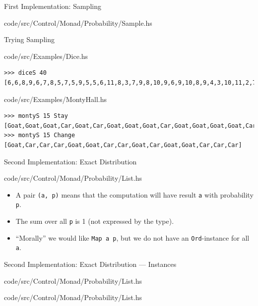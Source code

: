 ﻿\documentclass[aspectratio=169]{beamer}
\begin{document}
\begin{frame}{First Implementation: Sampling}
    
        {code/src/Control/Monad/Probability/Sample.hs}
\end{frame}

\begin{frame}[fragile]{Trying Sampling}
    
        {code/src/Examples/Dice.hs}
    \begin{lstlisting}[backgroundcolor=\color{lightgray}]
>>> diceS 40
[6,6,8,9,6,7,8,5,7,5,9,5,5,6,11,8,3,7,9,8,10,9,6,9,10,8,9,4,3,10,11,2,7,11,6,6,4,6,7,7]
    \end{lstlisting}
\pause
    
        {code/src/Examples/MontyHall.hs}
    \begin{lstlisting}[backgroundcolor=\color{lightgray}]
>>> montyS 15 Stay
[Goat,Goat,Goat,Car,Goat,Car,Goat,Goat,Goat,Car,Goat,Goat,Goat,Goat,Car]
>>> montyS 15 Change
[Goat,Car,Car,Car,Goat,Goat,Car,Car,Goat,Car,Goat,Goat,Car,Car,Car]
    \end{lstlisting}
\end{frame}

\begin{frame}{Second Implementation: Exact Distribution}
    
        {code/src/Control/Monad/Probability/List.hs}
    \begin{itemize}
        \item
            A pair {\tt (a, p)} means that the computation will have result
            {\tt a} with probability {\tt p}.
        \item
            The sum over all {\tt p} is 1 (not expressed by the type).
        \item
            ``Morally'' we would like {\tt Map a p}, but we do not have
            an {\tt Ord}-instance for all {\tt a}.
    \end{itemize}
\end{frame}

\begin{frame}{Second Implementation: Exact Distribution --- Instances}
    \begin{minipage}{0.5\textwidth}%
        
            {code/src/Control/Monad/Probability/List.hs}
    \end{minipage}%
    \begin{minipage}{0.5\textwidth}%
        
            {code/src/Control/Monad/Probability/List.hs}
    \end{minipage}%
\end{frame}
\end{document}
